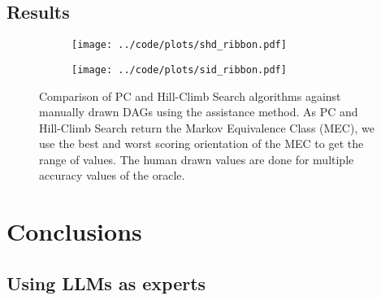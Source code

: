 \documentclass[letterpaper]{article} %
\begin{document}
\subsection{Results}
\begin{figure}
	\begin{subfigure}{0.5\textwidth}
		\centering
		\texttt{[image: ../code/plots/shd\_ribbon.pdf]}
		\caption{}
	\end{subfigure}
	\begin{subfigure}{0.5\textwidth}
		\centering
		\texttt{[image: ../code/plots/sid\_ribbon.pdf]}
		\caption{}
	\end{subfigure}
	\caption{Comparison of PC and Hill-Climb Search algorithms against
		manually drawn DAGs using the assistance method. As PC and
		Hill-Climb Search return the Markov Equivalence Class (MEC), we
		use the best and worst scoring orientation of the MEC to get
		the range of values. The human drawn values are done for
		multiple accuracy values of the oracle.}
\end{figure}

\section{Conclusions}
\subsection{Using LLMs as experts}


\end{document}
